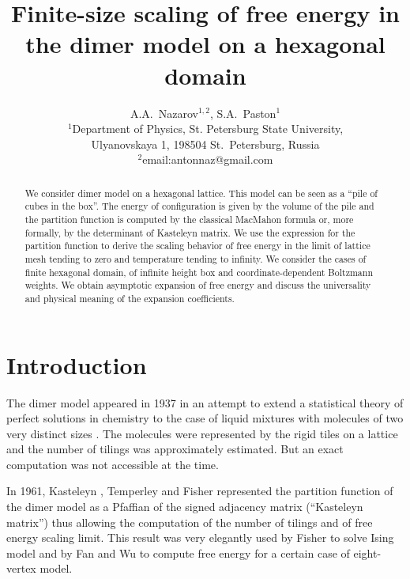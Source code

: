 \documentclass{article}
\begin{document}
\title{Finite-size scaling of free energy in the dimer model on a hexagonal domain}

\author{A.A.~Nazarov$^{1,2}$, S.A.~Paston$^{1}$\\
{\small
  $^{1}$Department of Physics, St. Petersburg State University,} \\
{\small  Ulyanovskaya 1, 198504 St.~Petersburg, Russia}\\
\small{$^{2}$email:antonnaz@gmail.com}
}
\date{}
\maketitle

\begin{abstract}
  We consider dimer model on a hexagonal lattice. This model can be
  seen as a ``pile of cubes in the box''. The energy of configuration
  is given by the volume of the pile and the partition function is
  computed by the classical MacMahon formula or, more formally, by the
  determinant of Kasteleyn matrix. We use the expression for the
  partition function to derive the scaling behavior of free energy in
  the limit of lattice mesh tending to zero and temperature tending to
  infinity. We consider the cases of finite hexagonal domain, of
  infinite height box and coordinate-dependent Boltzmann weights. We
  obtain asymptotic expansion of free energy and discuss the
  universality and physical meaning of the expansion coefficients.
\end{abstract}


\section*{Introduction}
\label{sec:introduction}
The dimer model appeared in 1937 in an attempt to extend a statistical theory of perfect solutions
in chemistry to the case of liquid mixtures with molecules of two very distinct sizes
\cite{Fowler-1937}. The molecules were represented by the rigid tiles on a lattice and the number of
tilings was approximately estimated. But an exact computation was not accessible at the time.

In 1961, Kasteleyn \cite{P.W-1961}, Temperley and Fisher \cite{doi:10.1080/14786436108243366}
represented the partition function of the dimer model as a Pfaffian of the signed adjacency matrix
(``Kasteleyn matrix'') thus allowing the computation of the number of tilings and of free energy scaling limit.
This result was very elegantly used by Fisher to solve Ising model \cite{fisher1966dimer} and by Fan
and Wu \cite{Fan-1970} to compute free energy for a certain case of eight-vertex model.
\end{document}
